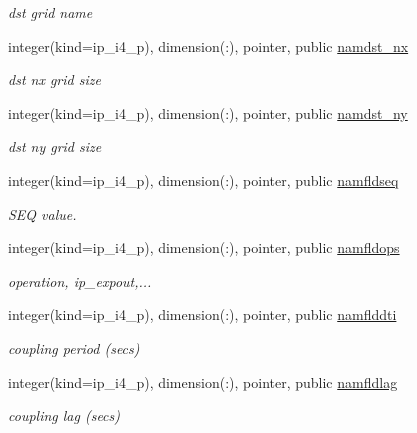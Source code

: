 \begin{DoxyCompactItemize}
\begin{DoxyCompactList}\small\item\em dst grid name \end{DoxyCompactList}\item 
integer(kind=ip\+\_\+i4\+\_\+p), dimension(\+:), pointer, public \hyperlink{namespacemod__oasis__namcouple_a6add94418eefdaefd78cd971888a5826}{namdst\+\_\+nx}
\begin{DoxyCompactList}\small\item\em dst nx grid size \end{DoxyCompactList}\item 
integer(kind=ip\+\_\+i4\+\_\+p), dimension(\+:), pointer, public \hyperlink{namespacemod__oasis__namcouple_a9035fc89396bad9574c88642d3aac5f0}{namdst\+\_\+ny}
\begin{DoxyCompactList}\small\item\em dst ny grid size \end{DoxyCompactList}\item 
integer(kind=ip\+\_\+i4\+\_\+p), dimension(\+:), pointer, public \hyperlink{namespacemod__oasis__namcouple_a54ccfe0380fc1c89d085f37a044a297e}{namfldseq}
\begin{DoxyCompactList}\small\item\em S\+EQ value. \end{DoxyCompactList}\item 
integer(kind=ip\+\_\+i4\+\_\+p), dimension(\+:), pointer, public \hyperlink{namespacemod__oasis__namcouple_a4841e350d91926f5f8403e73442c76ad}{namfldops}
\begin{DoxyCompactList}\small\item\em operation, ip\+\_\+expout,... \end{DoxyCompactList}\item 
integer(kind=ip\+\_\+i4\+\_\+p), dimension(\+:), pointer, public \hyperlink{namespacemod__oasis__namcouple_a9080617143dacb027f74c4c5158b5e58}{namflddti}
\begin{DoxyCompactList}\small\item\em coupling period (secs) \end{DoxyCompactList}\item 
integer(kind=ip\+\_\+i4\+\_\+p), dimension(\+:), pointer, public \hyperlink{namespacemod__oasis__namcouple_a6a4406ca14f91ef6514a18eb154e648f}{namfldlag}
\begin{DoxyCompactList}\small\item\em coupling lag (secs) \end{DoxyCompactList}\item 

\end{DoxyCompactItemize}
